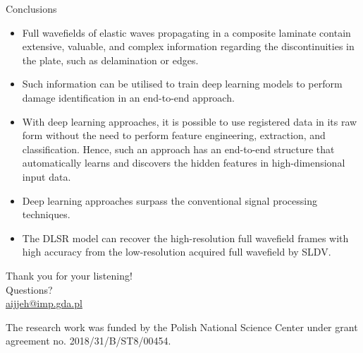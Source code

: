 \documentclass[10pt,aspectratio=169]{beamer} %
\begin{document}
\begin{frame}{Conclusions}
	\footnotesize
	\begin{itemize}
		\item Full wavefields of elastic waves propagating in a composite laminate contain extensive, valuable, and complex information regarding the discontinuities in the plate, such as delamination or edges.
		\item Such information can be utilised to train deep learning models
		to perform damage identification in an end-to-end approach.
		\item With deep	learning approaches, it is possible to use registered data in its raw form without the need to perform feature engineering, extraction, and classification. 
		Hence, such an approach has an end-to-end structure that automatically learns and discovers the hidden features in high-dimensional input data.
		\item Deep learning approaches surpass the conventional signal processing techniques.
		\item The DLSR model can recover the high-resolution full wavefield
		frames with high accuracy from the low-resolution acquired full wavefield by SLDV.
		
	\end{itemize}
\end{frame}

{
\begin{frame}[standout]
 Thank you for your listening!\\ \vspace{12pt}
 Questions?\\ \vspace{12pt}
 \url{aijjeh@imp.gda.pl}
 
\par\medskip
\par\medskip

 \footnotesize
 The research work was funded by the Polish National Science Center under grant agreement no. 2018/31/B/ST8/00454.
\end{frame}
}
\end{document}
